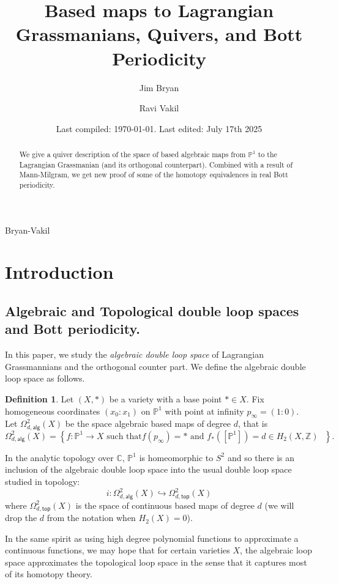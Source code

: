 \documentclass{amsart}
\title{Based maps to Lagrangian Grassmanians, Quivers, and Bott Periodicity}
\date{Last compiled:  \today.  Last edited: July 17th 2025}
\author{Jim Bryan}
\author{Ravi Vakil}
\theoremstyle{definition}
\newtheorem{definition}[theorem]{Definition}
\newcommand{\CC} {{\mathbb C}}          %
\newcommand{\ZZ} {{\mathbb Z}}		%
\newcommand{\PP}{\mathbb{P}}
\newcommand{\alg}{\mathsf{alg}}
\renewcommand{\top}{\mathsf{top}}
\newcommand{\LoopTwo}{\Omega^{2}_{d,\alg}}
\newcommand{\LoopTwoTop}{\Omega^{2}_{d,\top}}
\begin{document}
\begin{abstract}
We give a quiver description of the space of based algebraic maps from
$\PP^{1}$ to the Lagrangian Grassmanian (and its orthogonal
counterpart). Combined with a result of Mann-Milgram, we get new proof of some
of the homotopy equivalences in real Bott periodicity.
\end{abstract}

\maketitle 

  {Bryan-Vakil}



\section{Introduction}\label{sec: intro}



\subsection{Algebraic and Topological double loop spaces and Bott periodicity.}

In this paper, we study the \emph{algebraic double loop space} of
Lagrangian Grassmannians and the orthogonal counter part. We define the
algebraic double loop space as follows.

\begin{definition}\label{defn: Omega2alg(X)}
Let $(X,*)$ be a variety with a base point $*\in X$. Fix homogeneous
coordinates $(x_{0}:x_{1})$ on $\PP^{1}$ with point at infinity
$p_{\infty}=(1:0)$. Let $\LoopTwo(X)$ be the space algebraic based
maps of degree $d$, that is
\[
\LoopTwo (X) = \left\{f:\PP^{1}\to X\text{ such that
$f(p_{\infty})=*$ and $f_{*}([\PP^{1}])=d\in H_{2}(X,\ZZ )$ } \right\} .
\]
\end{definition}

In the analytic topology over $\CC$, $\PP^{1}$ is homeomorphic to
$S^{2}$ and so there is an inclusion of the algebraic double loop
space into the usual double loop space studied in topology:
\[
i:\LoopTwo (X) \hookrightarrow \LoopTwoTop (X)
\]
where $\LoopTwoTop (X)$ is the space of continuous based maps of
degree $d$ (we will drop the $d$ from the notation when $H_{2}(X)=0$).

In the same spirit as using high degree polynomial functions to
approximate a continuous functions, we may hope that for certain
varieties $X$, the algebraic loop space approximates the topological
loop space in the sense that it captures most of its homotopy theory.
\end{document}
